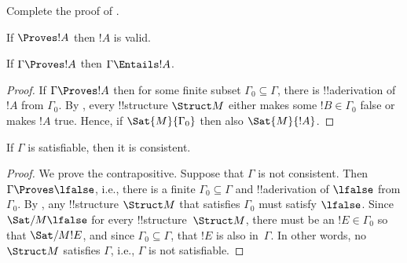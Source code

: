 \documentclass[../../include/open-logic-section]{subfiles}
\begin{document}
\begin{prob}
Complete the proof of .
\end{prob}

\begin{cor}
If $\Proves !A$ then $!A$ is valid.
\end{cor}

\begin{cor}
If $\Gamma \Proves !A$ then $\Gamma \Entails !A$.
\end{cor}

\begin{proof}
If $\Gamma \Proves !A$ then for some finite subset $\Gamma_0 \subseteq
\Gamma$, there is !!a{derivation} of $!A$ from $\Gamma_0$.  By
, every !!{structure} $\Struct M$ either
makes some $!B \in \Gamma_0$ false or makes $!A$ true.  Hence, if
$\Sat{M}{\Gamma_0}$ then also $\Sat{M}{!A}$.
\end{proof}

\begin{cor}
If $\Gamma$ is satisfiable, then it is consistent.
\end{cor}

\begin{proof}
We prove the contrapositive.  Suppose that $\Gamma$ is not
consistent.  Then $\Gamma \Proves \lfalse$, i.e., there is a finite
$\Gamma_0 \subseteq \Gamma$ and !!a{derivation} of $\lfalse$
from $\Gamma_0$. By , any !!{structure} 
$\Struct M$ that satisfies $\Gamma_0$ must satisfy $\lfalse$.  
Since $\Sat/{M}{\lfalse}$ for every !!{structure}~$\Struct M$,
there must be an $!E \in \Gamma_0$ so that $\Sat/{M}{!E}$, 
and since $\Gamma_0 \subseteq \Gamma$, that $!E$ is also
in~$\Gamma$.  In other words, no $\Struct M$ satisfies $\Gamma$, 
i.e., $\Gamma$ is not satisfiable.
\end{proof}
\end{document}
